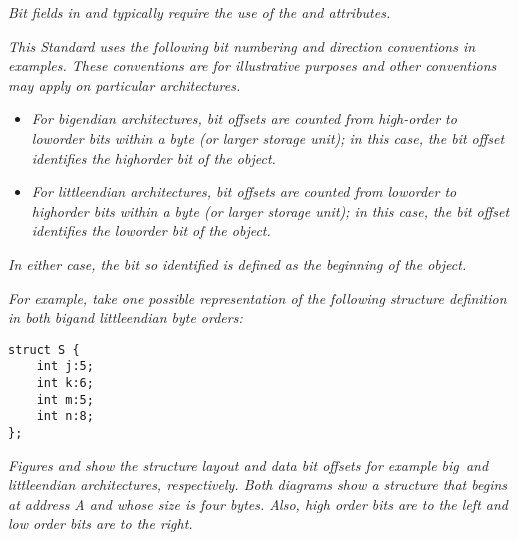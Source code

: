 \textit{Bit fields in  and  
typically 
require the use 
of 
the
 and 
 attributes.}

\textit{This Standard uses the following bit numbering and direction
conventions in examples. These conventions are for illustrative
purposes and other conventions may apply on particular
architectures.}
\begin{itemize}
\item \textit{For big\dash endian architectures, bit offsets are
counted from high-order to low\dash order bits within a byte (or
larger storage unit); in this case, the bit offset identifies
the high\dash order bit of the object.}

\item \textit{For little\dash endian architectures, bit offsets are
counted from low\dash order to high\dash order bits within a byte (or
larger storage unit); in this case, the bit offset identifies
the low\dash order bit of the object.}
\end{itemize}


\textit{In either case, the bit so identified is defined as the 
beginning of the object.}

\textit{For example, take one possible representation of the following 
 structure definition 
in both big\dash and little\dash endian byte orders:}

\begin{lstlisting}
struct S {
    int j:5;
    int k:6;
    int m:5;
    int n:8;
};
\end{lstlisting}

\textit{Figures  and
show the structure layout
and data bit offsets for example big\dash\   and little\dash endian
architectures, respectively. Both diagrams show a structure
that begins at address A and whose size is four bytes. Also,
high order bits are to the left and low order bits are to
the right.}

